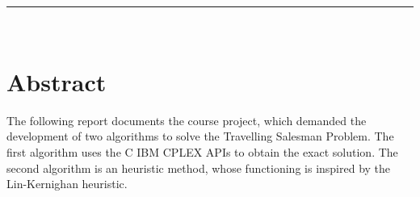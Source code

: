 \documentclass[a4paper,12pt]{article}
\begin{document}



\begingroup
\hypersetup{colorlinks=false, linkcolor=black}
\thispagestyle{empty}
\tableofcontents
\thispagestyle{empty}
\listoffigures
\thispagestyle{empty}
\listoftables
\endgroup


\thispagestyle{empty}
\clearpage
\noindent\rule[2pt]{\textwidth}{0.5pt}\\
\thispagestyle{empty}
\section*{Abstract}
The following report documents the course project, which demanded the development of two algorithms to solve the Travelling Salesman Problem. The first algorithm uses the C IBM CPLEX APIs to obtain the exact solution. The second algorithm is an heuristic method, whose functioning is inspired by the Lin-Kernighan heuristic.


\pagestyle{fancy}

\cleardoublepage


\clearpage

\clearpage

\clearpage



\clearpage
%



\clearpage
\end{document}
